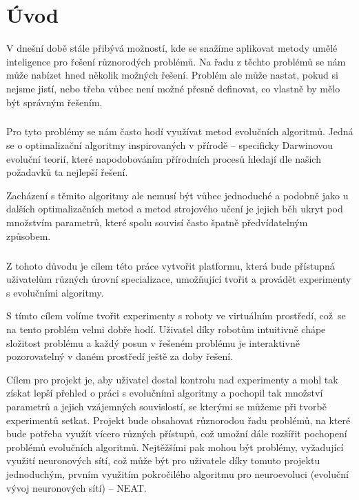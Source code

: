 \chapter*{Úvod}

V dnešní době stále přibývá možností, kde se snažíme aplikovat metody umělé
inteligence pro řešení různorodých problémů. Na řadu z těchto problémů se nám
může nabízet hned několik možných řešení. Problém ale může nastat, pokud si
nejsme jistí, nebo třeba vůbec není možné přesně definovat, co vlastně by mělo
být správným řešením.

\paragraph{}
Pro tyto problémy se nám často hodí využívat metod evolučních algoritmů. Jedná
se o optimalizační algoritmy inspirovaných v přírodě -- specificky Darwinovou
evoluční teorií, které napodobováním přírodních procesů hledají dle našich
požadavků ta nejlepší řešení.

Zacházení s těmito algoritmy ale nemusí být vůbec jednoduché a podobně jako u
dalších optimalizačních metod a metod strojového učení je jejich běh ukryt pod
množstvím parametrů, které spolu souvisí často špatně předvídatelným způsobem.

\paragraph{}
Z tohoto důvodu je cílem této práce vytvořit platformu, která bude přístupná
uživatelům různých úrovní specializace, umožňující tvořit a provádět
experimenty s evolučními algoritmy. 

S tímto cílem volíme tvořit experimenty s roboty ve virtuálním prostředí,
což~se na tento problém velmi dobře hodí. Uživatel díky robotům intuitivně
chápe složitost problému a každý posun v řešeném problému je interaktivně
pozorovatelný v daném prostředí ještě za doby řešení.

Cílem pro projekt je, aby uživatel dostal kontrolu nad experimenty a mohl tak
získat lepší přehled o práci s evolučními algoritmy a pochopil tak množství
parametrů a jejich vzájemných souvislostí, se kterými se můžeme při tvorbě
experimentů setkat. Projekt bude obsahovat různorodou řadu problémů, na které
bude potřeba využít vícero různých přístupů, což umožní dále rozšířit pochopení
problémů evolučních algoritmů. Nejtěžšími pak mohou být problémy, vyžadující
využití neuronových sítí, což může být pro uživatele díky tomuto projektu
jednoduchým, prvním využitím pokročilého algoritmu pro neuroevoluci (evoluční
vývoj neuronových sítí) -- NEAT.

